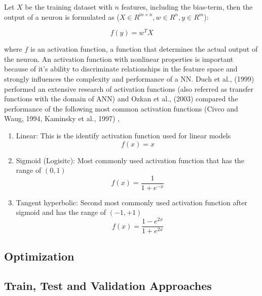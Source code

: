 \documentclass[12pt]{article}
\begin{document}
Let $X$ be the training dataset with $n$ features, including the bias-term, then the output of a neuron is formulated as ($X \in R^{m \times n}, w \in R^{n}, y \in R ^{m}$):

\begin{equation}
f(y) = w^{T}  X 
\end{equation}

where $f$ is an activation function, a function that determines the actual output of the neuron. An activation function with nonlinear properties is important because of it's ability to discriminate relationships in the feature space and strongly influences the complexity and performance of a NN.  Duch et al., (1999) \cite{duch} performed an extensive research of activation functions (also referred as transfer functions with the domain of ANN) and Ozkan et al., (2003) \cite{ozkan} compared the performance of the following most common activation functions (Civco and Waug, 1994, Kaminsky et al., 1997) \cite{civco}, \cite{kaminsky}
\begin{enumerate}
	\item Linear: This is the identify activation function used for linear models
	\begin{equation}
	f(x) = x
	\end{equation}
	\item Sigmoid (Logisitc): Most commonly used activation function that has the range of $(0, 1)$
	\begin{equation}
	f(x) = \frac{1}{1 + e^{-x}}
	\end{equation}
	\item Tangent hyperbolic: Second most commonly used activation function after sigmoid and has the range of $(-1, +1)$
	\begin{equation}
	f(x) = \frac{1 - e^{2x}}{1 + e^{2x}}
	\end{equation}
\end{enumerate}









\subsection{Optimization}

\subsection{Train, Test and Validation Approaches}
\end{document}
